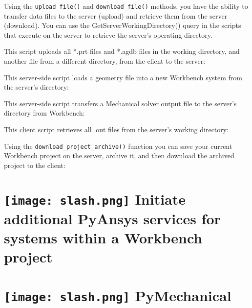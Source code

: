 \documentclass[9pt,landscape]{article}
\begin{document}
\begin{multicols}{3}

Using the \texttt{upload_file()} and \texttt{download_file()} methods, you have the ability to transfer data files to the server (upload) and retrieve them from the server (download).
You can use the GetServerWorkingDirectory() query in the scripts that execute on the server to retrieve the server's operating directory.

This script uploads all *.prt files and *.agdb files in the working directory, and another file from a different directory, from the client to the server:

\vspace{2mm} %

This server-side script loads a geometry file into a new Workbench system from the server's directory:


This server-side script transfers a Mechanical solver output file to the server's directory from Workbench:


This client script retrieves all .out files from the server's working directory:


Using the \texttt{download_project_archive()} function you can save your current Workbench project on the server, archive it, and then download the archived project to the client:




\section{\texttt{[image: slash.png]} Initiate additional PyAnsys services for systems within a Workbench project}

\section{\texttt{[image: slash.png]} PyMechanical}


\end{multicols}
\end{document}
